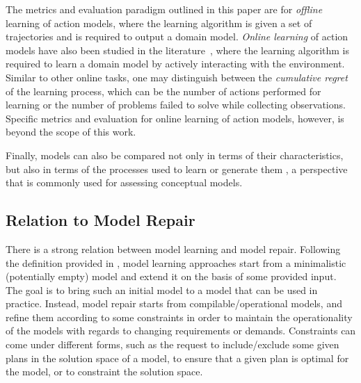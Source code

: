 \documentclass{article}
\theoremstyle{definition}
\theoremstyle{remark}
\newif\ifaddcomments
\newcommand{\todo}[1]{\ifaddcomments{\textcolor{red}{[TODO: #1]}}\fi}
\newcommand{\roni}[1]{\ifaddcomments{\textcolor{red}{[Roni: #1]}}\fi}
\newcommand{\argaman}[1]{\ifaddcomments{\textcolor{blue}{[Argaman: #1]}}\fi}
\newcommand{\yarin}[1]{\ifaddcomments{\textcolor{teal}{[Yarin: #1]}}\fi}
\newcommand{\leo}[1]{\ifaddcomments{\textcolor{pink}{[Leonardo: #1]}}\fi}
\begin{document}
\yarin{We can add a section on trajectories with not successful actions too @Argaman}
\argaman{I think the paper is already too packed to add this to the discussion...}
\todo{Maybe talk about metrics for online learning}
\leo{For the online case we could mention a measure of informativeness of the generated trajectories, or a measure of efficiency (e.g. action costs) for generating the trace}
The metrics and evaluation paradigm outlined in this paper are for \emph{offline} learning of action models, where the learning algorithm is given a set of trajectories and is required to output a domain model. \emph{Online learning} of action models have also been studied in the literature~\citep{lamanna2021online, sreedharan2023optimistic, benyamin2025integratingreinforcementlearningaction, ng2019incremental, chitnis2021glib, verma2023autonomous, karia2023epistemic, jin2022creativity}\todo{More citations?}, where the learning algorithm is required to learn a domain model by actively interacting with the environment. Similar to other online tasks, one may distinguish between the \emph{cumulative regret} of the learning process, which can be the number of actions performed for learning or the number of problems failed to solve while collecting observations. 
Specific metrics and evaluation for online learning of action models, however, is beyond the scope of this work. 

Finally, models can also be compared not only in terms of their characteristics, but also in terms of the processes used to learn or generate them \citep{vallati2021quality}, a perspective that is commonly used for assessing conceptual models.




\subsection{Relation to Model Repair}
There is a strong relation between model learning and model repair. Following the definition provided in \cite{bercher2025aSurvey}, model learning approaches start from a minimalistic (potentially empty) model and extend it on the basis of some provided input. The goal is to bring such an initial model to a model that can be used in practice. Instead, model repair starts from compilable/operational models, and refine them according to some constraints in order to maintain the operationality of the models with regards to changing requirements or demands. Constraints can come under different forms, such as the request to include/exclude some given plans in the solution space of a model, to ensure that a given plan is optimal for the model, or to constraint the solution space. 
\end{document}
